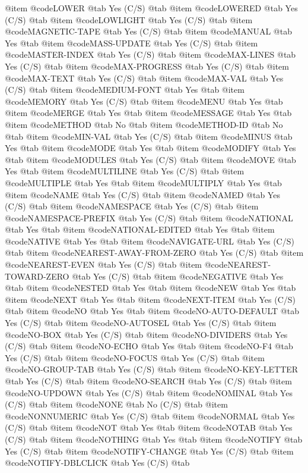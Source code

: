 @item @code{LOWER} @tab Yes	(C/S) @tab
@item @code{LOWERED} @tab Yes	(C/S) @tab
@item @code{LOWLIGHT} @tab Yes	(C/S) @tab
@item @code{MAGNETIC-TAPE} @tab Yes	(C/S) @tab
@item @code{MANUAL} @tab Yes @tab
@item @code{MASS-UPDATE} @tab Yes (C/S) @tab
@item @code{MASTER-INDEX} @tab Yes (C/S) @tab
@item @code{MAX-LINES} @tab Yes	(C/S) @tab
@item @code{MAX-PROGRESS} @tab Yes	(C/S) @tab
@item @code{MAX-TEXT} @tab Yes	(C/S) @tab
@item @code{MAX-VAL} @tab Yes	(C/S) @tab
@item @code{MEDIUM-FONT} @tab Yes @tab
@item @code{MEMORY} @tab Yes	(C/S) @tab
@item @code{MENU} @tab Yes @tab
@item @code{MERGE} @tab Yes @tab
@item @code{MESSAGE} @tab Yes @tab
@item @code{METHOD} @tab No @tab
@item @code{METHOD-ID} @tab No @tab
@item @code{MIN-VAL} @tab Yes	(C/S) @tab
@item @code{MINUS} @tab Yes @tab
@item @code{MODE} @tab Yes @tab
@item @code{MODIFY} @tab Yes @tab
@item @code{MODULES} @tab Yes	(C/S) @tab
@item @code{MOVE} @tab Yes @tab
@item @code{MULTILINE} @tab Yes	(C/S) @tab
@item @code{MULTIPLE} @tab Yes @tab
@item @code{MULTIPLY} @tab Yes @tab
@item @code{NAME} @tab Yes (C/S) @tab
@item @code{NAMED} @tab Yes (C/S) @tab
@item @code{NAMESPACE} @tab Yes	(C/S) @tab
@item @code{NAMESPACE-PREFIX} @tab Yes	(C/S) @tab
@item @code{NATIONAL} @tab Yes @tab
@item @code{NATIONAL-EDITED} @tab Yes @tab
@item @code{NATIVE} @tab Yes @tab
@item @code{NAVIGATE-URL} @tab Yes	(C/S) @tab
@item @code{NEAREST-AWAY-FROM-ZERO} @tab Yes	(C/S) @tab
@item @code{NEAREST-EVEN} @tab Yes	(C/S) @tab
@item @code{NEAREST-TOWARD-ZERO} @tab Yes	(C/S) @tab
@item @code{NEGATIVE} @tab Yes @tab
@item @code{NESTED} @tab Yes @tab
@item @code{NEW} @tab Yes @tab
@item @code{NEXT} @tab Yes @tab
@item @code{NEXT-ITEM} @tab Yes	(C/S) @tab
@item @code{NO} @tab Yes @tab
@item @code{NO-AUTO-DEFAULT} @tab Yes	(C/S) @tab
@item @code{NO-AUTOSEL} @tab Yes	(C/S) @tab
@item @code{NO-BOX} @tab Yes	(C/S) @tab
@item @code{NO-DIVIDERS} @tab Yes	(C/S) @tab
@item @code{NO-ECHO} @tab Yes @tab
@item @code{NO-F4} @tab Yes	(C/S) @tab
@item @code{NO-FOCUS} @tab Yes	(C/S) @tab
@item @code{NO-GROUP-TAB} @tab Yes	(C/S) @tab
@item @code{NO-KEY-LETTER} @tab Yes	(C/S) @tab
@item @code{NO-SEARCH} @tab Yes	(C/S) @tab
@item @code{NO-UPDOWN} @tab Yes	(C/S) @tab
@item @code{NOMINAL} @tab Yes (C/S) @tab
@item @code{NONE} @tab No	(C/S) @tab
@item @code{NONNUMERIC} @tab Yes	(C/S) @tab
@item @code{NORMAL} @tab Yes	(C/S) @tab
@item @code{NOT} @tab Yes @tab
@item @code{NOTAB} @tab Yes	(C/S) @tab
@item @code{NOTHING} @tab Yes @tab
@item @code{NOTIFY} @tab Yes	(C/S) @tab
@item @code{NOTIFY-CHANGE} @tab Yes	(C/S) @tab
@item @code{NOTIFY-DBLCLICK} @tab Yes	(C/S) @tab
